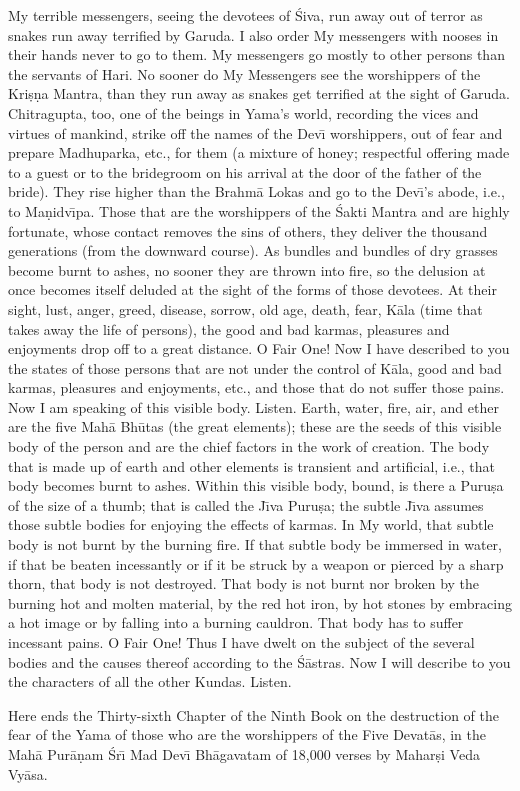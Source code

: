 My terrible messengers, seeing the devotees of \'Siva, run away out of terror as snakes run away terrified by Garuda. I also order My messengers with nooses in their hands never to go to them. My messengers go mostly to other persons than the servants of Hari. No sooner do My Messengers see the worshippers of the Kri\d{s}\d{n}a Mantra, than they run away as snakes get terrified at the sight of Garuda. Chitragupta, too, one of the beings in Yama's world, recording the vices and virtues of mankind, strike off the names of the Dev\={\i} worshippers, out of fear and prepare Madhuparka, etc., for them (a mixture of honey; respectful offering made to a guest or to the bridegroom on his arrival at the door of the father of the bride). They rise higher than the Brahm\=a Lokas and go to the Dev\={\i}'s abode, i.e., to Ma\d{n}idv\={\i}pa. Those that are the worshippers of the \'Sakti Mantra and are highly fortunate, whose contact removes the sins of others, they deliver the thousand generations (from the downward course). As bundles and bundles of dry grasses become burnt to ashes, no sooner they are thrown into fire, so the delusion at once becomes itself deluded at the sight of the forms of those devotees. At their sight, lust, anger, greed, disease, sorrow, old age, death, fear, K\=ala (time that takes away the life of persons), the good and bad karmas, pleasures and enjoyments drop off to a great distance. O Fair One! Now I have described to you the states of those persons that are not under the control of K\=ala, good and bad karmas, pleasures and enjoyments, etc., and those that do not suffer those pains. Now I am speaking of this visible body. Listen. Earth, water, fire, air, and ether are the five Mah\=a Bh\=utas (the great elements); these are the seeds of this visible body of the person and are the chief factors in the work of creation. The body that is made up of earth and other elements is transient and artificial, i.e., that body becomes burnt to ashes. Within this visible body, bound, is there a Puru\d{s}a of the size of a thumb; that is called the J\={\i}va Puru\d{s}a; the subtle J\={\i}va assumes those subtle bodies for enjoying the effects of karmas. In My world, that subtle body is not burnt by the burning fire. If that subtle body be immersed in water, if that be beaten incessantly or if it be struck by a weapon or pierced by a sharp thorn, that body is not destroyed. That body is not burnt nor broken by the burning hot and molten material, by the red hot iron, by hot stones by embracing a hot image or by falling into a burning cauldron. That body has to suffer incessant pains. O Fair One! Thus I have dwelt on the subject of the several bodies and the causes thereof according to the \'S\=astras. Now I will describe to you the characters of all the other Kundas. Listen.

Here ends the Thirty-sixth Chapter of the Ninth Book on the destruction of the fear of the Yama of those who are the worshippers of the Five Devat\=as, in the Mah\=a Pur\=a\d{n}am \'Sr\={\i} Mad Dev\={\i} Bh\=agavatam of 18,000 verses by Mahar\d{s}i Veda Vy\=asa.



